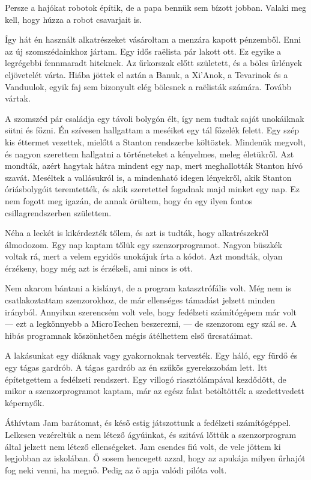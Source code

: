 \documentclass[10pt]{memoir}
\begin{document}
Persze a hajókat robotok építik, de a papa bennük sem bízott jobban. Valaki meg
kell, hogy húzza a robot csavarjait is.

Így hát én használt alkatrészeket vásároltam a menzára kapott pénzemből. Enni
az új szomszédainkhoz jártam. Egy idős raëlista pár lakott ott. Ez egyike a
legrégebbi fennmaradt hiteknek. Az űrkorszak előtt született, és a bölcs
űrlények eljövetelét várta. Hiába jöttek el aztán a Banuk, a Xi’Anok, a
Tevarinok és a Vanduulok, egyik faj sem bizonyult elég bölcsnek a raëlisták
számára. Tovább vártak.

A szomszéd pár családja egy távoli bolygón élt, így nem tudtak saját unokáiknak
sütni és főzni. Én szívesen hallgattam a meséiket egy tál főzelék felett. Egy
szép kis éttermet vezettek, mielőtt a Stanton rendszerbe költöztek. Mindenük
megvolt, és nagyon szerettem hallgatni a történeteket a kényelmes, meleg
életükről. Azt mondták, azért hagytak hátra mindent egy nap, mert meghallották
Stanton hívó szavát. Meséltek a vallásukról is, a mindenható idegen lényekről,
akik Stanton óriásbolygóit teremtették, és akik szeretettel fogadnak majd
minket egy nap. Ez nem fogott meg igazán, de annak örültem, hogy én egy ilyen
fontos csillagrendszerben születtem.

Néha a leckét is kikérdezték tőlem, és azt is tudták, hogy alkatrészekről
álmodozom. Egy nap kaptam tőlük egy szenzorprogramot. Nagyon büszkék voltak rá,
mert a velem egyidős unokájuk írta a kódot. Azt mondták, olyan érzékeny, hogy
még azt is érzékeli, ami nincs is ott.

Nem akarom bántani a kislányt, de a program katasztrófális volt. Még nem is
csatlakoztattam szenzorokhoz, de már ellenséges támadást jelzett minden
irányból. Annyiban szerencsém volt vele, hogy fedélzeti számítógépem már volt —
ezt a legkönnyebb a MicroTechen beszerezni, — de szenzorom egy szál se. A hibás
programnak köszönhetően mégis átélhettem első űrcsatáimat.

A lakásunkat egy diáknak vagy gyakornoknak tervezték. Egy háló, egy fürdő és
egy tágas gardrób. A tágas gardrób az én szűkös gyerekszobám lett. Itt
építetgettem a fedélzeti rendszert. Egy villogó riasztólámpával kezdődött, de
mikor a szenzorprogramot kaptam, már az egész falat betöltötték a szedettvedett
képernyők.

Áthívtam Jam barátomat, és késő estig játszottunk a fedélzeti számítógéppel.
Lelkesen vezéreltük a nem létező ágyúinkat, és szitává lőttük a szenzorprogram
által jelzett nem létező ellenségeket. Jam csendes fiú volt, de vele jöttem ki
legjobban az iskolában. Ő sosem hencegett azzal, hogy az apukája milyen űrhajót
fog neki venni, ha megnő. Pedig az ő apja valódi pilóta volt.
\end{document}
